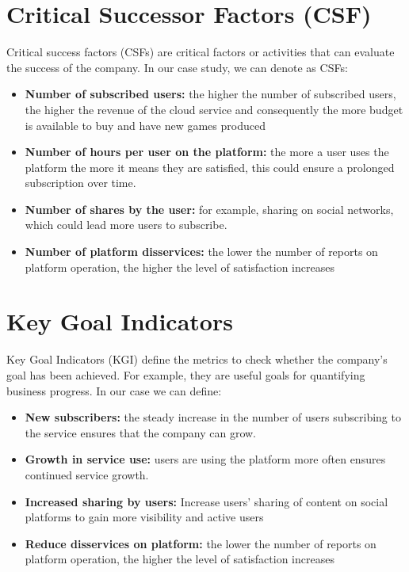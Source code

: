 \documentclass[a4paper,12pt]{report}
\begin{document}
\section{Critical Successor Factors (CSF)}
Critical success factors (CSFs) are critical factors or activities that can evaluate the success of the company. In our case study, we can denote as CSFs:
\begin{itemize}
\item{\textbf{Number of subscribed users:} the higher the number of subscribed users, the higher the revenue of the cloud service and consequently the more budget is available to buy and have new games produced }
\item{\textbf{Number of hours per user on the platform:} the more a user uses the platform the more it means they are satisfied, this could ensure a prolonged subscription over time.  }
\item{\textbf{Number of shares by the user:} for example, sharing on social networks, which could lead more users to subscribe.}
\item{\textbf{Number of platform disservices:} the lower the number of reports on platform operation, the higher the level of satisfaction increases}
\end{itemize}
\newpage
\section{Key Goal Indicators}
Key Goal Indicators (KGI) define the metrics to check whether the company's goal has been achieved. 
For example, they are useful goals for quantifying business progress. In our case we can define:
\begin{itemize}
\item{\textbf{New subscribers:} the steady increase in the number of users subscribing to the service ensures that the company can grow. }
\item{\textbf{Growth in service use:} users are using the platform more often ensures continued service growth.}
\item{\textbf{Increased sharing by users:} Increase users' sharing of content on social platforms to gain more visibility and active users } 
\item{\textbf{Reduce disservices on platform:} the lower the number of reports on platform operation, the higher the level of satisfaction increases}
\end{itemize}
\end{document}
